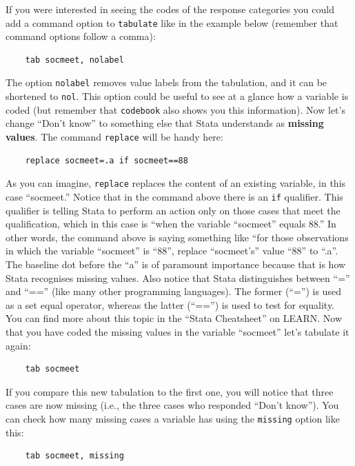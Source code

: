 \documentclass{article}
\begin{document}
If you were interested in seeing the codes of the response categories you could add a command option to \texttt{tabulate} like in the example below (remember that command options follow a comma):

\begin{lstlisting}
	tab socmeet, nolabel
\end{lstlisting}

The option \texttt{nolabel} removes value labels from the tabulation, and it can be shortened to \texttt{nol}. This option could be useful to see at a glance how a variable is coded (but remember that \texttt{codebook} also shows you this information). Now let's change ``Don't know'' to something else that Stata understands as \textbf{missing values}. The command \texttt{replace} will be handy here:

\begin{lstlisting}
	replace socmeet=.a if socmeet==88
\end{lstlisting}

As you can imagine, \texttt{replace} replaces the content of an existing variable, in this case ``socmeet.'' Notice that in the command above there is an \texttt{if} qualifier. This qualifier is telling Stata to perform an action only on those cases that meet the qualification, which in this case is ``when the variable ``socmeet'' equals 88.'' In other words, the command above is saying something like ``for those observations in which the variable ``socmeet'' is ``88'', replace ``socmeet's'' value ``88'' to ``.a''. The baseline dot before the ``a'' is of paramount importance because that is how Stata recognises missing values. Also notice that Stata distinguishes between ``='' and ``=='' (like many other programming languages). The former (``='') is used as a set equal operator, whereas the latter (``=='') is used to test for equality. You can find more about this topic in the ``Stata Cheatsheet'' on LEARN. Now that you have coded the missing values in the variable ``socmeet'' let's tabulate it again:

\begin{lstlisting}
	tab socmeet
\end{lstlisting}

If you compare this new tabulation to the first one, you will notice that three cases are now missing (i.e., the three cases who responded ``Don't know''). You can check how many missing cases a variable has using the \texttt{missing} option like this:

\begin{lstlisting}
	tab socmeet, missing
\end{lstlisting}  
\end{document}
